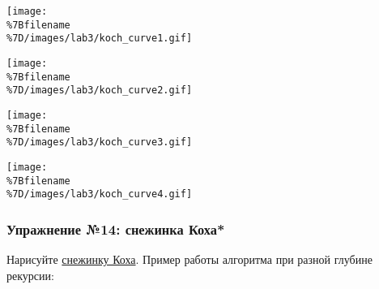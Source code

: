 \texttt{[image: \\\%7Bfilename\\\%7D/images/lab3/koch\_curve1.gif]}

\texttt{[image: \\\%7Bfilename\\\%7D/images/lab3/koch\_curve2.gif]}

\texttt{[image: \\\%7Bfilename\\\%7D/images/lab3/koch\_curve3.gif]}

\texttt{[image: \\\%7Bfilename\\\%7D/images/lab3/koch\_curve4.gif]}

\begin{Shaded}
\begin{Highlighting}[]
 

 
     \OperatorTok{==} \NormalTok{:}
    \NormalTok{:}
        \OperatorTok{/}\NormalTok{)}
        \NormalTok{)}
        \OperatorTok{/}\NormalTok{)}
        \NormalTok{)}
        \OperatorTok{/}\NormalTok{)}
        \NormalTok{)}
        \OperatorTok{/}\NormalTok{)}

\OperatorTok{=} 
\OperatorTok{=} \OperatorTok{/}\OperatorTok{*}\OperatorTok{**}
\OperatorTok{=} 

\OperatorTok{-}\OperatorTok{/}\NormalTok{, }\OperatorTok{-}\OperatorTok{/}\NormalTok{)}

\end{Highlighting}
\end{Shaded}

\subsubsection{Упражнение №14: снежинка
Коха*}\label{ux443ux43fux440ux430ux436ux43dux435ux43dux438ux435-14-ux441ux43dux435ux436ux438ux43dux43aux430-ux43aux43eux445ux430}

Нарисуйте
\href{https://wikipedia.org/ru/\%D0\%9A\%D1\%80\%D0\%B8\%D0\%B2\%D0\%B0\%D1\%8F_\%D0\%9A\%D0\%BE\%D1\%85\%D0\%B0}{снежинку
Коха}. Пример работы алгоритма при разной глубине рекурсии:

